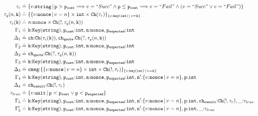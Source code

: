 \documentclass[master,english]{kuisthesis}
\theoremstyle{definition}
\begin{document}
{\small
\begin{align*}
    \tau_{r} \doteq&\ \nut{string}{
\price > \costprice {\implies}
 v = \success \land
\price \leq \costprice {\implies} 
v = \fail \land (v = \success \lor v = \fail)  }
    \\\tau_{q}(n,\Code{k}) \doteq&\ \{\nut{nonce}{v = n} \times \Code{int} \times \Ch(\tau_{r})\}_{\nut{key(int)}{v = \Code{k}}}
    \\\tau_{c}(\Code{k}) \doteq&\ n{:}\Code{nonce} \times \Ch(!,\tau_{q}(n, \Code{k}))
    \\\Gamma_1 \doteq&\  \Code{k}{:}\keyT{\Code{string}},\costprice{:}\Code{int},\Code{n}{:}\Code{nonce},\exprice{:}\Code{int}
    \\\Delta_1 \doteq&\ \Code{ch}{:}\Ch(\tau_{c}(\Code{k})), \chq{:}\Ch(?,\tau_{q}(n, \Code{k}))
    \\\Gamma_2 \doteq&\  \Code{k}{:}\keyT{\Code{string}},\costprice{:}\Code{int},\Code{n}{:}\Code{nonce},\exprice{:}\Code{int}
    \\\Delta_2 \doteq&\ \chq{:}\Ch(?,\tau_{q}(n, \Code{k})) 
    \\\Gamma_3 \doteq&\  \Code{k}{:}\keyT{\Code{string}},\costprice{:}\Code{int},\Code{n}{:}\Code{nonce},\exprice{:}\Code{int}
    \\\Delta_3 \doteq&\ \Code{cmsg}{:}\{\nut{nonce}{v = n} \times \Code{int} \times \Ch(!,\tau_{r})\}_{\nut{key(int)}{v = \Code{k}}}
    \\\Gamma_4 \doteq&\  \Code{k}{:}\keyT{\Code{string}},\costprice{:}\Code{int},\Code{n}{:}\Code{nonce},\exprice{:}\Code{int}, \Code{n'}{:}\nut{nonce}{v = n}, \Code{p}{:}\Code{int}
    \\\Delta_4 \doteq&\  \chr{:}\Ch(!,\tau_{r})
    \\\tau_{true} \doteq&\ \nut{unit}{\price < \costprice \lor \price < \exprice}
    \\\Gamma_5 \doteq&\ \Code{k}{:}\keyT{\Code{string}},\costprice{:}\Code{int},\Code{n}{:}\Code{nonce}, \exprice{:}\Code{int}, \Code{n'}{:}\nut{nonce}{v = n}, \Code{p}{:}\Code{int}, \chr{:}\Ch(!,\tau_{r}), \Code{\_}{:}\tau_{true}
    \\\Gamma_5' \doteq&\ \Code{k}{:}\keyT{\Code{string}},\costprice{:}\Code{int},\Code{n}{:}\Code{nonce}, \exprice{:}\Code{int}, \Code{n'}{:}\nut{nonce}{v = n}, \Code{p}{:}\Code{int}, \Code{\_}{:}\tau_{true}
\end{align*}}
\end{document}
